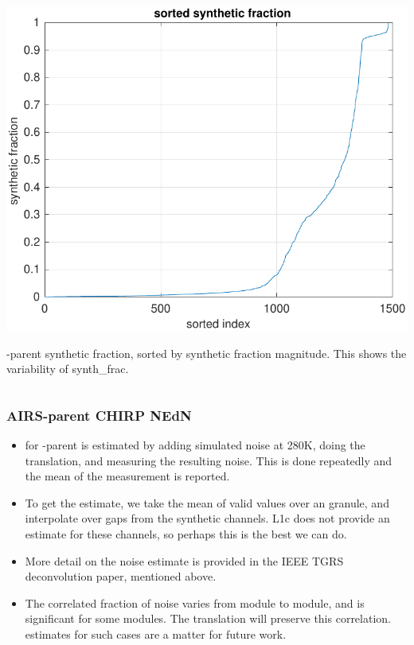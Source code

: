 \documentclass[9pt]{beamer}
\begin{document}
\begin{frame}
\begin{columns}[t]
\begin{column}{0.5\textwidth}
  \begin{centering}
  \includegraphics[width=\textwidth]{figures/chirp_sorted_syn_frac.pdf}
  \end{centering}\vspace{3mm}

{\airs}-parent {\chirp} synthetic fraction, sorted by synthetic
fraction magnitude.  This shows the variability of synth\_frac.

\end{column}
\end{columns}
\end{frame}
\begin{frame}
\frametitle{AIRS-parent CHIRP NEdN}

\begin{itemize}

  \item {\nedn} for {\airs}-parent {\chirp} is estimated by adding
    simulated {\airs} noise at 280K, doing the translation, and
    measuring the resulting noise.  This is done repeatedly and the
    mean of the measurement is reported.

  \item To get the {\airs} estimate, we take the mean of valid
    {\nedn} values over an {\airs} granule, and interpolate over
    gaps from the synthetic channels.  {\airs} L1c does not provide
    an {\nedn} estimate for these channels, so perhaps this is the
    best we can do.

  \item More detail on the noise estimate is provided in the IEEE TGRS
    {\airs} deconvolution paper, mentioned above.

  \item The correlated fraction of {\airs} noise varies from module
    to module, and is significant for some modules.  The translation
    will preserve this correlation.  {\nedn} estimates for such
    cases are a matter for future work.

\end{itemize}
\end{frame}
\end{document}
